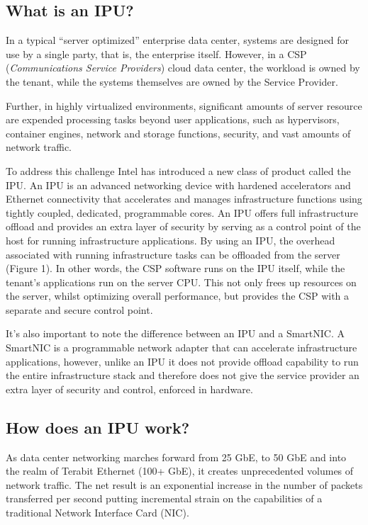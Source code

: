 \documentclass[../sn.tex]{subfiles}
\begin{document}
\subsection{What is an IPU?}
In a typical “server optimized” enterprise data center, systems are designed for use by a single party, that is, the enterprise itself.
However, in a CSP (\textit{Communications Service Providers}) cloud data center, the workload is owned by the tenant, while the systems themselves are owned by the Service Provider.

Further, in highly virtualized environments, significant amounts of server resource are expended processing tasks beyond user applications, such as hypervisors, container engines, network and storage functions, security, and vast amounts of network traffic.

To address this challenge Intel has introduced a new class of product called the IPU.
An IPU is an advanced networking device with hardened accelerators and Ethernet connectivity that accelerates and manages infrastructure functions using tightly coupled, dedicated, programmable cores.
An IPU offers full infrastructure offload and provides an extra layer of security by serving as a control point of the host for running infrastructure applications.
By using an IPU, the overhead associated with running infrastructure tasks can be offloaded from the server (Figure 1).
In other words, the CSP software runs on the IPU itself, while the tenant's applications run on the server CPU. 
This not only frees up resources on the server, whilst optimizing overall performance, but provides the CSP with a separate and secure control point.

It's also important to note the difference between an IPU and a SmartNIC.
A SmartNIC is a programmable network adapter that can accelerate infrastructure applications, however, unlike an IPU it does not provide offload capability to run the entire infrastructure stack and therefore does not give the service provider an extra layer of security and control, enforced in hardware.

\subsection{How does an IPU work?}
As data center networking marches forward from 25 GbE, to 50 GbE and into the realm of Terabit Ethernet (100+ GbE), it creates unprecedented volumes of network traffic.
The net result is an exponential increase in the number of packets transferred per second putting incremental strain on the capabilities of a traditional Network Interface Card (NIC).
\end{document}
